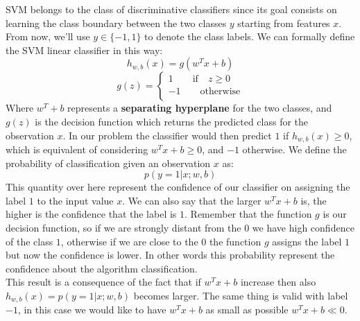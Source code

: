 SVM belongs to the class of discriminative classifiers since its goal consists on learning the class boundary between the two classes $y$ starting from features $x$. From now, we'll use $y\in\{-1,1\}$ to denote the class labels.
We can formally define the SVM linear classifier in this way:
$$h_{w,b}(x) = g(w^Tx + b)$$
$$
g(z)=
\begin{cases}
1\qquad \text{if} \quad z \geq 0\\
-1\qquad \text{otherwise}\\
\end{cases}
$$
Where $w^T + b$ represents a \textbf{separating hyperplane} for the two classes, and $g(z)$ is the decision function which returns the predicted class for the observation $x$.
In our problem the classifier would then predict $1$ if $h_{w,b}(x) \geq 0$, which is equivalent of considering $w^Tx + b \geq 0$, and $-1$ otherwise.
We define the probability of classification given an observation $x$ as:
$$p(y = 1 | x; w,b)$$
This quantity over here represent the confidence of our classifier on assigning the label $1$ to the input value $x$. We can also say that the larger $w^Tx + b$ is, the higher is the confidence that the label is $1$. Remember that the function $g$ is our decision function, so if we are strongly distant from the $0$ we have high confidence of the class $1$, otherwise if we are close to the $0$ the function $g$ assigns the label $1$ but now the confidence is lower. In other words this probability represent the confidence about the algorithm classification.\\
This result is a consequence of the fact that if $w^Tx + b$ increase then also $h_{w,b}(x)= p(y = 1 | x; w,b)$ becomes larger. The same thing is valid with label $-1$, in this case we would like to have $w^Tx + b$ as small as possible $w^Tx + b \ll 0$.\\


